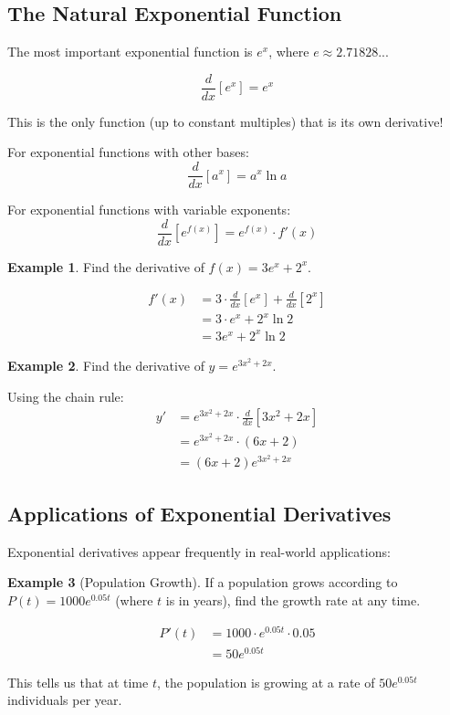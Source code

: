 \documentclass[12pt,a4paper]{book}
\theoremstyle{definition}
\newtheorem{example}{Example}[chapter]
\begin{document}
\subsection{The Natural Exponential Function}

\begin{keyformula}
The most important exponential function is $e^x$, where $e \approx 2.71828...$

$$\frac{d}{dx}[e^x] = e^x$$

This is the only function (up to constant multiples) that is its own derivative!

For exponential functions with other bases:
$$\frac{d}{dx}[a^x] = a^x \ln a$$

For exponential functions with variable exponents:
$$\frac{d}{dx}[e^{f(x)}] = e^{f(x)} \cdot f'(x)$$
\end{keyformula}

\begin{example}
Find the derivative of $f(x) = 3e^x + 2^x$.

\begin{align}
f'(x) &= 3 \cdot \frac{d}{dx}[e^x] + \frac{d}{dx}[2^x]\\
&= 3 \cdot e^x + 2^x \ln 2\\
&= 3e^x + 2^x \ln 2
\end{align}
\end{example}

\begin{example}
Find the derivative of $y = e^{3x^2 + 2x}$.

Using the chain rule:
\begin{align}
y' &= e^{3x^2 + 2x} \cdot \frac{d}{dx}[3x^2 + 2x]\\
&= e^{3x^2 + 2x} \cdot (6x + 2)\\
&= (6x + 2)e^{3x^2 + 2x}
\end{align}
\end{example}

\subsection{Applications of Exponential Derivatives}

Exponential derivatives appear frequently in real-world applications:

\begin{example}[Population Growth]
If a population grows according to $P(t) = 1000e^{0.05t}$ (where $t$ is in years), find the growth rate at any time.

\begin{align}
P'(t) &= 1000 \cdot e^{0.05t} \cdot 0.05\\
&= 50e^{0.05t}
\end{align}

This tells us that at time $t$, the population is growing at a rate of $50e^{0.05t}$ individuals per year.
\end{example}
\end{document}
